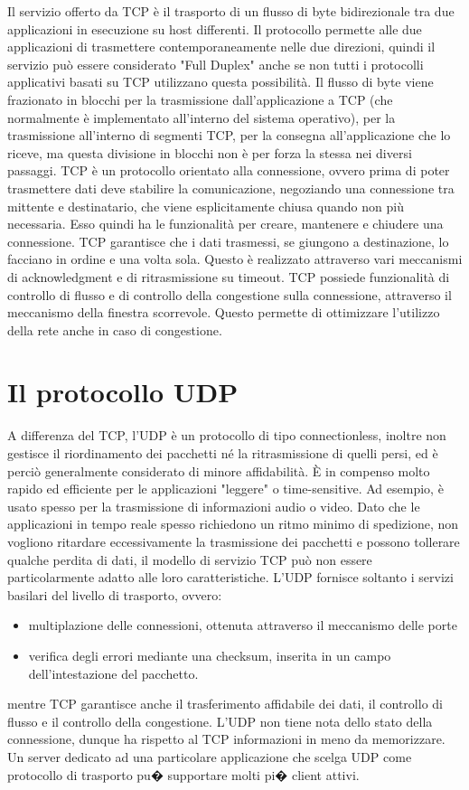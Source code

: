 Il servizio offerto da TCP è il trasporto di un flusso di byte bidirezionale tra due applicazioni in esecuzione su host differenti. Il protocollo permette alle due applicazioni di trasmettere contemporaneamente nelle due direzioni, quindi il servizio può essere considerato "Full Duplex" anche se non tutti i protocolli applicativi basati su TCP utilizzano questa possibilità.
Il flusso di byte viene frazionato in blocchi per la trasmissione dall'applicazione a TCP (che normalmente è implementato all'interno del sistema operativo), per la trasmissione all'interno di segmenti TCP, per la consegna all'applicazione che lo riceve, ma questa divisione in blocchi non è per forza la stessa nei diversi passaggi.
TCP è un protocollo orientato alla connessione, ovvero prima di poter trasmettere dati deve stabilire la comunicazione, negoziando una connessione tra mittente e destinatario, che viene esplicitamente chiusa quando non più necessaria. Esso quindi ha le funzionalità per creare, mantenere e chiudere una connessione.
TCP garantisce che i dati trasmessi, se giungono a destinazione, lo facciano in ordine e una volta sola. Questo è realizzato attraverso vari meccanismi di acknowledgment e di ritrasmissione su timeout.
TCP possiede funzionalità di controllo di flusso e di controllo della congestione sulla connessione, attraverso il meccanismo della finestra scorrevole. Questo permette di ottimizzare l'utilizzo della rete anche in caso di congestione.

\section{Il protocollo UDP}
A differenza del TCP, l'UDP è un protocollo di tipo connectionless, inoltre non gestisce il riordinamento dei pacchetti né la ritrasmissione di quelli persi, ed è perciò generalmente considerato di minore affidabilità. È in compenso molto rapido ed efficiente per le applicazioni "leggere" o time-sensitive. Ad esempio, è usato spesso per la trasmissione di informazioni audio o video. Dato che le applicazioni in tempo reale spesso richiedono un ritmo minimo di spedizione, non vogliono ritardare eccessivamente la trasmissione dei pacchetti e possono tollerare qualche perdita di dati, il modello di servizio TCP può non essere particolarmente adatto alle loro caratteristiche. L'UDP fornisce soltanto i servizi basilari del livello di trasporto, ovvero:
\begin{itemize}
    \item multiplazione delle connessioni, ottenuta attraverso il meccanismo delle porte
    \item verifica degli errori mediante una checksum, inserita in un campo dell'intestazione del pacchetto.
\end{itemize}
mentre TCP garantisce anche il trasferimento affidabile dei dati, il controllo di flusso e il controllo della congestione.
L'UDP non tiene nota dello stato della connessione, dunque ha rispetto al TCP informazioni in meno da memorizzare. Un server dedicato ad una particolare applicazione che scelga UDP come protocollo di trasporto pu� supportare molti pi� client attivi.

